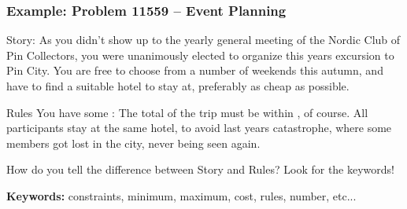 \begin{frame}
  \frametitle{Example: Problem 11559 -- Event Planning}

  {\smaller
  \begin{alertblock}{Story:}
    As you didn't show up to the yearly general meeting of the Nordic
    Club of Pin Collectors, you were unanimously elected to organize
    this years excursion to Pin City.  You are free to choose from a
    number of weekends this autumn, and have to find a suitable hotel
    to stay at, preferably as cheap as possible.
  \end{alertblock}

  \begin{exampleblock}{Rules}
    You have some : The total
     of the trip must be within
    , of course. All participants
     stay at the same hotel, to avoid last years
    catastrophe, where some members got lost in the city, never being seen
    again.
  \end{exampleblock}}

  How do you tell the difference between Story and Rules? Look for the keywords!
  \bigskip

  {\bf Keywords:} constraints, minimum, maximum, cost, rules, number, etc...
\end{frame}

